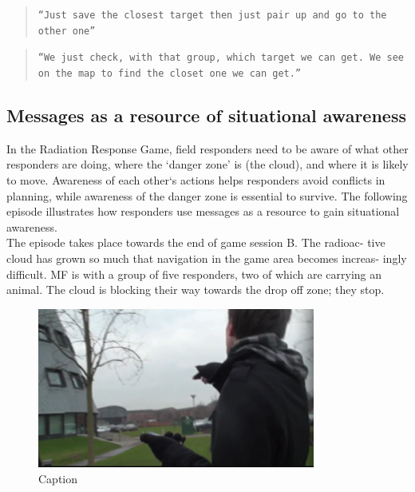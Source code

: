 \begin{quote}
\texttt{``Just save the closest target then just pair up and go to the other one'' }
\end{quote}

\begin{quote}
\texttt{``We just check, with that group, which target we can get. We see on the map to find the closet one we can get.''}
\end{quote}




\subsection{Messages as a resource of situational awareness}
In the Radiation Response Game, field responders need to be aware of what other responders are doing, where the `danger zone' is (the cloud), and where it is likely to move. Awareness of each other`s actions helps responders avoid conflicts in planning, while awareness of the danger zone is essential to survive. The following episode illustrates how responders use messages as a resource to gain situational awareness.\\

The episode takes place towards the end of game session B. The radioac- tive cloud has grown so much that navigation in the game area becomes increas- ingly difficult. MF is with a group of five responders, two of which are carrying an animal. The cloud is blocking their way towards the drop off zone; they stop.\\

\begin{figure}[h]
  \centering
  \includegraphics[width=.6\textwidth]{img/study1/ep3/ep31}
  \caption{Caption}
  \label{fig:study1ep31}
\end{figure}

\noindent{}


